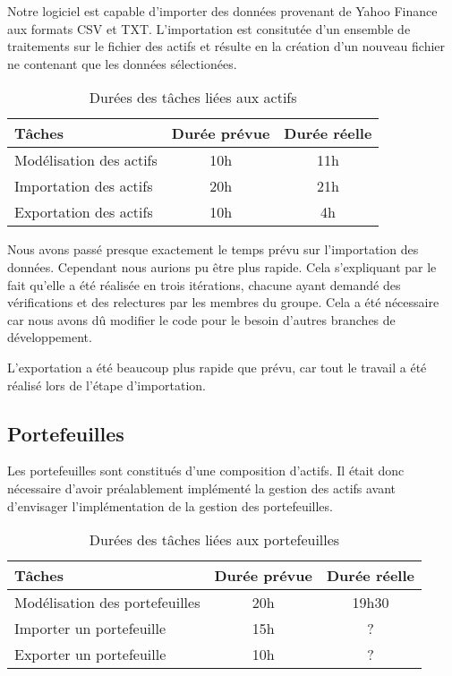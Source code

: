 \documentclass[a4paper]{report}
\begin{document}
Notre logiciel est capable d'importer des données provenant de Yahoo Finance aux formats CSV et TXT. L'importation est consitutée d'un ensemble de traitements sur le fichier des actifs et résulte en la création d'un nouveau fichier ne contenant que les données sélectionées. 

\begin{table}[H]
\centering
  \begin{tabularx}{0.8\textwidth}{| X | c | c |}
    \hline
	Tâches & Durée prévue & Durée réelle\\
    \hline
    Modélisation des actifs & 10h & 11h\\
    Importation des actifs & 20h & 21h\\
    Exportation des actifs & 10h & 4h\\
    \hline
  \end{tabularx}
  \caption{Durées des tâches liées aux actifs}
\end{table}

Nous avons passé presque exactement le temps prévu sur l'importation des données. Cependant nous aurions pu être plus rapide. Cela s'expliquant par le fait qu'elle a été réalisée en trois itérations, chacune ayant demandé des vérifications et des relectures par les membres du groupe. Cela a été nécessaire car nous avons dû modifier le code pour le besoin d'autres branches de développement.

L'exportation a été beaucoup plus rapide que prévu, car tout le travail a été réalisé lors de l'étape d'importation.

\subsection{Portefeuilles}
Les portefeuilles sont constitués d'une composition d'actifs. Il était donc nécessaire d'avoir préalablement implémenté la gestion des actifs avant d'envisager l'implémentation de la gestion des portefeuilles.

\begin{table}[H]
\centering
  \begin{tabularx}{0.8\textwidth}{| X | c | c |}
    \hline
	Tâches & Durée prévue & Durée réelle \\
    \hline
     Modélisation des portefeuilles &  20h & 19h30\\
     Importer un portefeuille &  15h & ?\\
     Exporter un portefeuille &  10h & ?\\
    \hline
  \end{tabularx}
  \caption{Durées des tâches liées aux portefeuilles}
\end{table}
\end{document}
